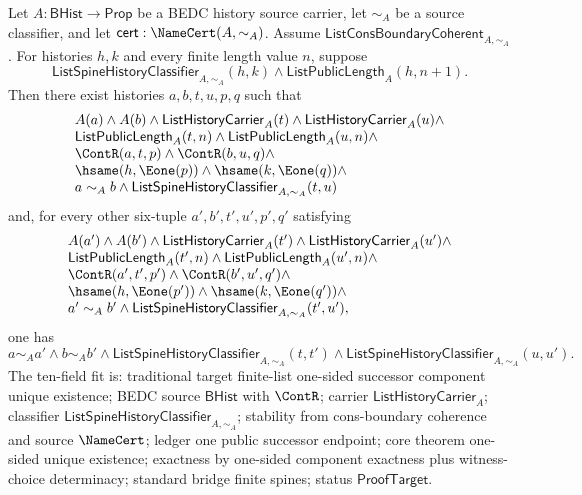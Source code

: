 \begin{theorem}
\label{thm:list-classified-successor-one-sided-component-unique-existence}
Let $A:\mathsf{BHist}\to\mathsf{Prop}$ be a BEDC history source carrier, let
$\sim_A$ be a source classifier, and let
$\mathsf{cert}:\NameCert(A,\sim_A)$. Assume
$\mathsf{ListConsBoundaryCoherent}_{A,\sim_A}$. For histories $h,k$ and every
finite length value $n$, suppose
$$
\mathsf{ListSpineHistoryClassifier}_{A,\sim_A}(h,k)\land
\mathsf{ListPublicLength}_A(h,n+1).
$$
Then there exist histories $a,b,t,u,p,q$ such that
$$
\begin{array}{l}
A(a)\land A(b)\land
\mathsf{ListHistoryCarrier}_A(t)\land
\mathsf{ListHistoryCarrier}_A(u)\land\\
\mathsf{ListPublicLength}_A(t,n)\land
\mathsf{ListPublicLength}_A(u,n)\land\\
\ContR(a,t,p)\land \ContR(b,u,q)\land\\
\hsame(h,\Eone(p))\land \hsame(k,\Eone(q))\land\\
a\sim_A b\land
\mathsf{ListSpineHistoryClassifier}_{A,\sim_A}(t,u)
\end{array}
$$
and, for every other six-tuple $a',b',t',u',p',q'$ satisfying
$$
\begin{array}{l}
A(a')\land A(b')\land
\mathsf{ListHistoryCarrier}_A(t')\land
\mathsf{ListHistoryCarrier}_A(u')\land\\
\mathsf{ListPublicLength}_A(t',n)\land
\mathsf{ListPublicLength}_A(u',n)\land\\
\ContR(a',t',p')\land \ContR(b',u',q')\land\\
\hsame(h,\Eone(p'))\land \hsame(k,\Eone(q'))\land\\
a'\sim_A b'\land
\mathsf{ListSpineHistoryClassifier}_{A,\sim_A}(t',u'),
\end{array}
$$
one has
$$
a\sim_A a'\land b\sim_A b'\land
\mathsf{ListSpineHistoryClassifier}_{A,\sim_A}(t,t')\land
\mathsf{ListSpineHistoryClassifier}_{A,\sim_A}(u,u').
$$
The ten-field fit is: traditional target finite-list one-sided successor
component unique existence; BEDC source $\mathsf{BHist}$ with $\ContR$; carrier
$\mathsf{ListHistoryCarrier}_A$; classifier
$\mathsf{ListSpineHistoryClassifier}_{A,\sim_A}$; stability from cons-boundary
coherence and source $\NameCert$; ledger one public successor endpoint; core
theorem one-sided unique existence; exactness by one-sided component exactness
plus witness-choice determinacy; standard bridge finite spines; status
$\mathsf{ProofTarget}$.
\end{theorem}
